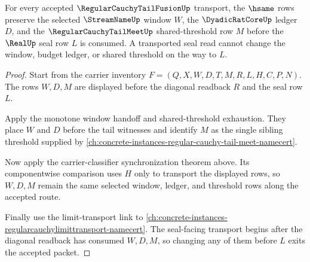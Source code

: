 \begin{theorem}
\label{thm:regular-cauchy-tail-fusion-window-transport-lock}
For every accepted $\RegularCauchyTailFusionUp$ transport, the $\hsame$ rows preserve the selected $\StreamNameUp$ window $W$, the $\DyadicRatCoreUp$ ledger $D$, and the $\RegularCauchyTailMeetUp$ shared-threshold row $M$ before the $\RealUp$ seal row $L$ is consumed. A transported seal read cannot change the window, budget ledger, or shared threshold on the way to $L$.
\end{theorem}
\begin{proof}
Start from the carrier inventory $F=(Q,X,W,D,T,M,R,L,H,C,P,N)$. The rows $W,D,M$ are displayed before the diagonal readback $R$ and the seal row $L$.

Apply the monotone window handoff and shared-threshold exhaustion. They place $W$ and $D$ before the tail witnesses and identify $M$ as the single sibling threshold supplied by \autoref{ch:concrete-instances-regular-cauchy-tail-meet-namecert}.

Now apply the carrier-classifier synchronization theorem above. Its componentwise comparison uses $H$ only to transport the displayed rows, so $W,D,M$ remain the same selected window, ledger, and threshold rows along the accepted route.

Finally use the limit-transport link to \autoref{ch:concrete-instances-regularcauchylimittransport-namecert}. The seal-facing transport begins after the diagonal readback has consumed $W,D,M$, so changing any of them before $L$ exits the accepted packet.
\end{proof}

